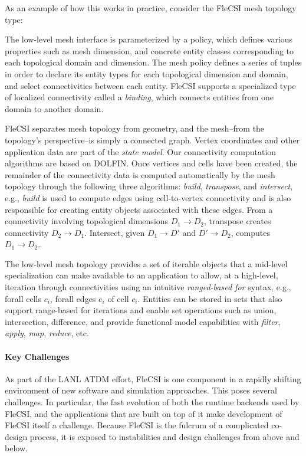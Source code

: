 As an example of how this works in practice, consider the FleCSI mesh
topology type:

The low-level mesh interface is parameterized by a policy, which defines
various properties such as mesh dimension, and concrete entity classes
corresponding to each topological domain and dimension. The mesh policy
defines a series of tuples in order to declare its entity types for each
topological dimension and domain, and select connectivities between each
entity. FleCSI supports a specialized type of localized connectivity
called a {\it binding}, which connects entities from one domain to
another domain.

FleCSI separates mesh topology from geometry, and the mesh--from the
topology's perspective--is simply a connected graph. Vertex coordinates
and other application data are part of the {\it state model}. Our
connectivity computation algorithms are based on
DOLFIN\cite{Logg:2010:DAF:1731022.1731030}.  Once vertices and cells
have been created, the remainder of the connectivity data is computed
automatically by the mesh topology through the following three
algorithms: {\it build}, {\it transpose}, and {\it intersect}, e.g.,
{\it build} is used to compute edges using cell-to-vertex connectivity
and is also responsible for creating entity objects associated with
these edges. From a connectivity involving topological dimensions
$D_1 \rightarrow D_2$, transpose creates connectivity $D_2 \rightarrow D_1$.
Intersect, given $D_1 \rightarrow D'$ and $D' \rightarrow D_2$, computes
$D_1 \rightarrow D_2$.  

The low-level mesh topology provides a set of iterable objects that a
mid-level specialization can make available to an application to allow,
at a high-level, iteration through connectivities using an intuitive
{\it ranged-based for} syntax, e.g., forall cells $c_i$, forall edges
$e_i$ of cell $c_i$. Entities can be stored in sets that also support
range-based for iterations and enable set operations such as union,
intersection, difference, and provide functional model capabilities with
{\it filter}, {\it apply}, {\it map}, {\it reduce}, etc.

\paragraph{Key Challenges}

As part of the LANL ATDM effort, FleCSI is one component in a rapidly
shifting environment of new software and simulation approaches. This
poses several challenges. In particular, the fast evolution of both the
runtime backends used by FleCSI, and the applications that are built on
top of it make development of FleCSI itself a challenge. Because FleCSI
is the fulcrum of a complicated co-design process, it is exposed to
instabilities and design challenges from above and below.

